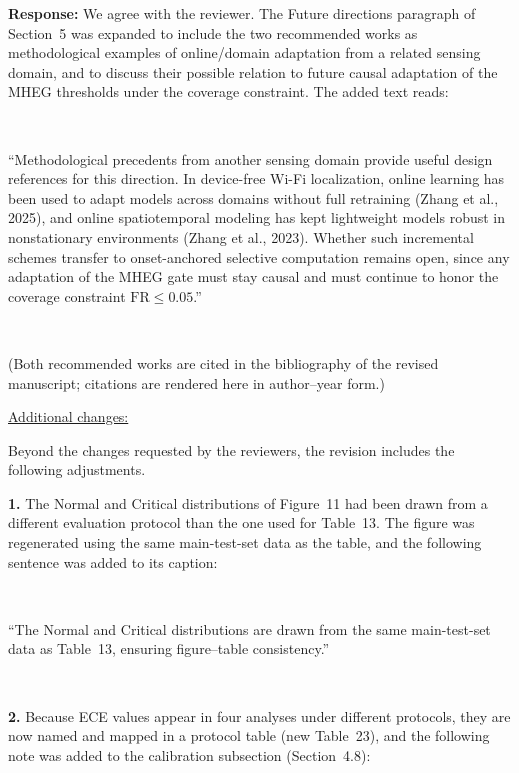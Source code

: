 \documentclass[1p,12pt,authoryear]{elsarticle}
\begin{document}
\vspace{2mm}
\noindent \textbf{Response:} We agree with the reviewer. The Future directions paragraph of Section~5 was expanded to include the two recommended works as methodological examples of online/domain adaptation from a related sensing domain, and to discuss their possible relation to future causal adaptation of the MHEG thresholds under the coverage constraint. The added text reads:

~

``Methodological precedents from another sensing domain provide useful design references for this direction. In device-free Wi-Fi localization, online learning has been used to adapt models across domains without full retraining (Zhang et al., 2025), and online spatiotemporal modeling has kept lightweight models robust in nonstationary environments (Zhang et al., 2023). Whether such incremental schemes transfer to onset-anchored selective computation remains open, since any adaptation of the MHEG gate must stay causal and must continue to honor the coverage constraint $\mathrm{FR}\le0.05$.''

~

\noindent (Both recommended works are cited in the bibliography of the revised manuscript; citations are rendered here in author--year form.)

\newpage


\begin{large}
\noindent \underline{Additional changes:}
\end{large}

\vspace{10pt}

\noindent Beyond the changes requested by the reviewers, the revision includes the following adjustments.

\vspace{2mm}
\noindent \textbf{1.} The Normal and Critical distributions of Figure~11 had been drawn from a different evaluation protocol than the one used for Table~13. The figure was regenerated using the same main-test-set data as the table, and the following sentence was added to its caption:

~

``The Normal and Critical distributions are drawn from the same main-test-set data as Table~13, ensuring figure--table consistency.''

~

\noindent \textbf{2.} Because ECE values appear in four analyses under different protocols, they are now named and mapped in a protocol table (new Table~23), and the following note was added to the calibration subsection (Section~4.8):
\end{document}

